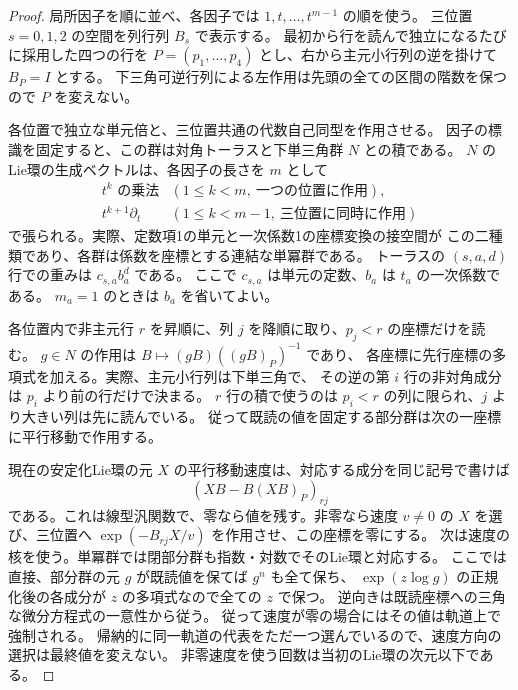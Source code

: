 \begin{proof}
局所因子を順に並べ、各因子では $1,t,\ldots,t^{m-1}$ の順を使う。
三位置 $s=0,1,2$ の空間を列行列 $B_s$ で表示する。
最初から行を読んで独立になるたびに採用した四つの行を
$P=(p_1,\ldots,p_4)$ とし、右から主元小行列の逆を掛けて $B_P=I$ とする。
下三角可逆行列による左作用は先頭の全ての区間の階数を保つので $P$ を変えない。

各位置で独立な単元倍と、三位置共通の代数自己同型を作用させる。
因子の標識を固定すると、この群は対角トーラスと下単三角群 $N$ との積である。
$N$ のLie環の生成ベクトルは、各因子の長さを $m$ として
\[
 \begin{array}{ll}
 t^k\text{ の乗法}&(1\le k<m,\ \text{一つの位置に作用}),\\
 t^{k+1}\partial_t &(1\le k<m-1,\ \text{三位置に同時に作用})
 \end{array}
\]
で張られる。実際、定数項1の単元と一次係数1の座標変換の接空間が
この二種類であり、各群は係数を座標とする連結な単冪群である。
トーラスの $(s,a,d)$ 行での重みは $c_{s,a} b_a^d$ である。
ここで $c_{s,a}$ は単元の定数、$b_a$ は $t_a$ の一次係数である。
$m_a=1$ のときは $b_a$ を省いてよい。

各位置内で非主元行 $r$ を昇順に、列 $j$ を降順に取り、$p_j<r$ の座標だけを読む。
$g\in N$ の作用は $B\mapsto (gB)((gB)_P)^{-1}$ であり、
各座標に先行座標の多項式を加える。実際、主元小行列は下単三角で、
その逆の第 $i$ 行の非対角成分は $p_i$ より前の行だけで決まる。
$r$ 行の積で使うのは $p_i<r$ の列に限られ、$j$ より大きい列は先に読んでいる。
従って既読の値を固定する部分群は次の一座標に平行移動で作用する。

現在の安定化Lie環の元 $X$ の平行移動速度は、対応する成分を同じ記号で書けば
\[
                 (XB-B(XB)_P)_{rj}
\]
である。これは線型汎関数で、零なら値を残す。非零なら速度 $v\ne0$ の
$X$ を選び、三位置へ $\exp(-B_{rj}X/v)$ を作用させ、この座標を零にする。
次は速度の核を使う。単冪群では閉部分群も指数・対数でそのLie環と対応する。
ここでは直接、部分群の元 $g$ が既読値を保てば $g^n$ も全て保ち、
$\exp(z\log g)$ の正規化後の各成分が $z$ の多項式なので全ての $z$ で保つ。
逆向きは既読座標への三角な微分方程式の一意性から従う。
従って速度が零の場合にはその値は軌道上で強制される。
帰納的に同一軌道の代表をただ一つ選んでいるので、速度方向の選択は最終値を変えない。
非零速度を使う回数は当初のLie環の次元以下である。


\end{proof}
